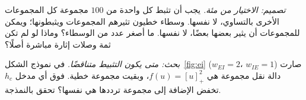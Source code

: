 \begin{exercise}[\lvlC]
\label{ex:03:7}
\emph{تصميم: الاختيار من مئة.} يجب أن تثبط كل واحدة من $100$ مجموعة  كل المجموعات الأخرى بالتساوي، لا نفسها. وسطاء  خطيون تثيرهم المجموعات ويثبطونها؛ ويمكن للمجموعات أن يثير بعضها بعضًا، لا نفسها. ما أصغر عدد من الوسطاء؟ وماذا لو لم تكن ثمة وصلات إثارة مباشرة أصلًا؟
\end{exercise}

\begin{exercise}[\lvlC]
\label{ex:03:8}
\emph{بحث: متى يكون التثبيط متناقضًا.} في نموذج الشكل~\ref{fig:ei} ($w_{EI}=2$، $w_{IE}=1$) صارت دالة نقل مجموعة  هي $f(u)=[u]_+^2$، وبقيت مجموعة  خطية. فوق أي مدخل $h_c$ تخفض الإضافة إلى مجموعة  ترددها هي نفسها؟ تحقق بالنمذجة.
\end{exercise}
